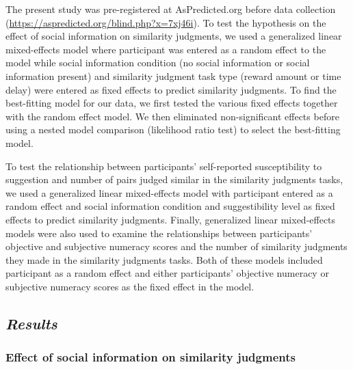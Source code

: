 \documentclass[
  pub,floatsintext]{apa6}
\begin{document}
The present study was pre-registered at AsPredicted.org before data collection (\url{https://aspredicted.org/blind.php?x=7xj46i}). To test the hypothesis on the effect of social information on similarity judgments, we used a generalized linear mixed-effects model where participant was entered as a random effect to the model while social information condition (no social information or social information present) and similarity judgment task type (reward amount or time delay) were entered as fixed effects to predict similarity judgments. To find the best-fitting model for our data, we first tested the various fixed effects together with the random effect model. We then eliminated non-significant effects before using a nested model comparison (likelihood ratio test) to select the best-fitting model.

To test the relationship between participants' self-reported susceptibility to suggestion and number of pairs judged similar in the similarity judgments tasks, we used a generalized linear mixed-effects model with participant entered as a random effect and social information condition and suggestibility level as fixed effects to predict similarity judgments. Finally, generalized linear mixed-effects models were also used to examine the relationships between participants' objective and subjective numeracy scores and the number of similarity judgments they made in the similarity judgments tasks. Both of these models included participant as a random effect and either participants' objective numeracy or subjective numeracy scores as the fixed effect in the model.

\hypertarget{results-2}{%
\subsection{\texorpdfstring{\emph{Results}}{Results}}\label{results-2}}

\hypertarget{effect-of-social-information-on-similarity-judgments}{%
\subsubsection{Effect of social information on similarity judgments}\label{effect-of-social-information-on-similarity-judgments}}
\end{document}
